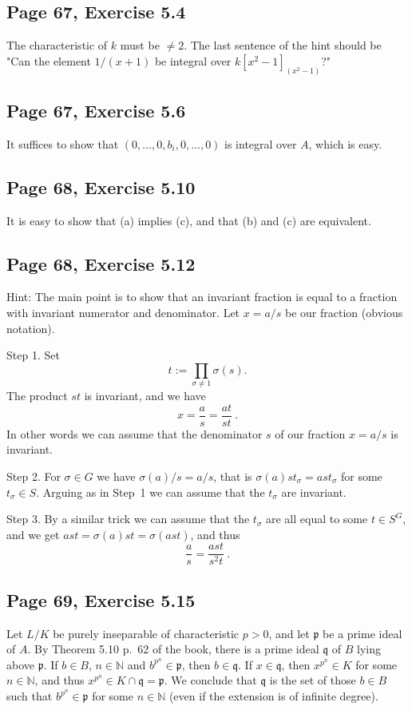 \documentclass[parskip=half,fontsize=12pt]{scrartcl}%
\newcommand{\mf}{\mathfrak}
\newcommand{\ppp}{\mf p}
\newcommand{\qqq}{\mf q}
\begin{document}
\subsection{Page 67, Exercise 5.4}%

The characteristic of $k$ must be $\ne2$. The last sentence of the hint should be "Can the element $1/(x + 1)$ be integral over $k[x^2-1]_{(x^2-1)}$?"  

\subsection{Page 67, Exercise 5.6}%

It suffices to show that $(0,\dots,0,b_i,0,\dots,0)$ is integral over $A$, which is easy.

\subsection{Page 68, Exercise 5.10}%

It is easy to show that (a) implies (c), and that (b) and (c) are equivalent.

\subsection{Page 68, Exercise 5.12}%

Hint: The main point is to show that an invariant fraction is equal to a fraction with invariant numerator and denominator. Let $x=a/s$ be our fraction (obvious notation). 

Step 1. Set 
$$
t:=\prod_{\sigma\ne1}\sigma(s).
$$ 
The product $st$ is invariant, and we have 
$$
x=\frac{a}{s}=\frac{at}{st}\ .
$$ 
In other words we can assume that the denominator $s$ of our fraction $x=a/s$ is invariant.

Step 2. For $\sigma\in G$ we have $\sigma(a)/s=a/s$, that is $\sigma(a)st_\sigma=ast_\sigma$ for some $t_\sigma\in S$. Arguing as in Step~1 we can assume that the $t_\sigma$ are invariant.

Step 3. By a similar trick we can assume that the $t_\sigma$ are all equal to some $t\in S^G$, and we get $ast=\sigma(a)st=\sigma(ast)$, and thus 
$$
\frac{a}{s}=\frac{ast}{s^2t}\ .
$$

\subsection{Page 69, Exercise 5.15}%

Let $L/K$ be purely inseparable of characteristic $p>0$, and let $\ppp$ be a prime ideal of $A$. By Theorem 5.10 p.~62 of the book, there is a prime ideal $\qqq$ of $B$ lying above $\ppp$. If $b\in B$, $n\in\mathbb N$ and $b^{p^n}\in\ppp$, then $b\in\qqq$. If $x\in\qqq$, then $x^{p^n}\in K$ for some $n\in\mathbb N$, and thus $x^{p^n}\in K\cap\qqq=\ppp$. We conclude that $\qqq$ is the set of those $b\in B$ such that $b^{p^n}\in\ppp$ for some $n\in\mathbb N$ (even if the extension is of infinite degree).
\end{document}
